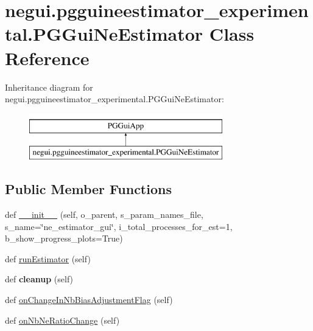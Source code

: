\hypertarget{classnegui_1_1pgguineestimator__experimental_1_1PGGuiNeEstimator}{}\section{negui.\+pgguineestimator\+\_\+experimental.\+P\+G\+Gui\+Ne\+Estimator Class Reference}
\label{classnegui_1_1pgguineestimator__experimental_1_1PGGuiNeEstimator}
Inheritance diagram for negui.\+pgguineestimator\+\_\+experimental.\+P\+G\+Gui\+Ne\+Estimator\+:\begin{figure}[H]
\begin{center}
\leavevmode
\includegraphics[height=2.000000cm]{classnegui_1_1pgguineestimator__experimental_1_1PGGuiNeEstimator}
\end{center}
\end{figure}
\subsection*{Public Member Functions}
\begin{DoxyCompactItemize}
\item 
def \hyperlink{classnegui_1_1pgguineestimator__experimental_1_1PGGuiNeEstimator_ad159a3c6dfe76e7895d517ee9c77d405}{\+\_\+\+\_\+init\+\_\+\+\_\+} (self, o\+\_\+parent, s\+\_\+param\+\_\+names\+\_\+file, s\+\_\+name=\char`\"{}ne\+\_\+estimator\+\_\+gui\char`\"{}, i\+\_\+total\+\_\+processes\+\_\+for\+\_\+est=1, b\+\_\+show\+\_\+progress\+\_\+plots=True)
\item 
def \hyperlink{classnegui_1_1pgguineestimator__experimental_1_1PGGuiNeEstimator_a21c83a7e246530f5f0755f59b0c5fcd5}{run\+Estimator} (self)
\item 
def {\bfseries cleanup} (self)\hypertarget{classnegui_1_1pgguineestimator__experimental_1_1PGGuiNeEstimator_a01d9f49c59d1b1370517b9eb866a8698}{}\label{classnegui_1_1pgguineestimator__experimental_1_1PGGuiNeEstimator_a01d9f49c59d1b1370517b9eb866a8698}

\item 
def \hyperlink{classnegui_1_1pgguineestimator__experimental_1_1PGGuiNeEstimator_aa01a9e1c8464abc2cc421152e7a471c9}{on\+Change\+In\+Nb\+Bias\+Adjustment\+Flag} (self)
\item 
def \hyperlink{classnegui_1_1pgguineestimator__experimental_1_1PGGuiNeEstimator_ab1bf1c7d0663393edf9972aab862337d}{on\+Nb\+Ne\+Ratio\+Change} (self)
\end{DoxyCompactItemize}
